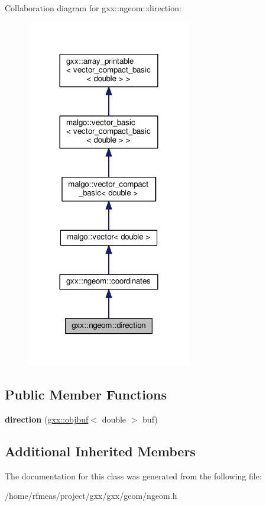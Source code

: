 Collaboration diagram for gxx\+:\+:ngeom\+:\+:direction\+:
\nopagebreak
\begin{figure}[H]
\begin{center}
\leavevmode
\includegraphics[width=204pt]{classgxx_1_1ngeom_1_1direction__coll__graph}
\end{center}
\end{figure}
\subsection*{Public Member Functions}
\begin{DoxyCompactItemize}
\item 
{\bfseries direction} (\hyperlink{classgxx_1_1object__buffer}{gxx\+::objbuf}$<$ double $>$ buf)\hypertarget{classgxx_1_1ngeom_1_1direction_a27b9b59ef7e2f99c9555b051447530a3}{}\label{classgxx_1_1ngeom_1_1direction_a27b9b59ef7e2f99c9555b051447530a3}

\end{DoxyCompactItemize}
\subsection*{Additional Inherited Members}


The documentation for this class was generated from the following file\+:\begin{DoxyCompactItemize}
\item 
/home/rfmeas/project/gxx/gxx/geom/ngeom.\+h\end{DoxyCompactItemize}
